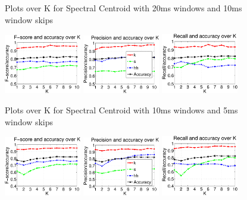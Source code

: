 {\begin{figure}
			\caption{Plots over K for Spectral Centroid with 20ms windows and 10ms window skips}
		\end{figure}
		\begin{figure}
			\centering\includegraphics[width=0.3\textwidth]{tex/appendices/test/scentroid105FP.png}
			\centering\includegraphics[width=0.3\textwidth]{tex/appendices/test/scentroid105_P.png}
			\centering\includegraphics[width=0.3\textwidth]{tex/appendices/test/scentroid105_R.png}
				
				\caption{Plots over K for Spectral Centroid with 10ms windows and 5ms window skips}
		\end{figure}
		\begin{figure}
			\centering\includegraphics[width=0.3\textwidth]{tex/appendices/test/scentroid52FP.png}
			\centering\includegraphics[width=0.3\textwidth]{tex/appendices/test/scentroid52_P.png}
			\centering\includegraphics[width=0.3\textwidth]{tex/appendices/test/scentroid52_R.png}
				

\end{figure}}
